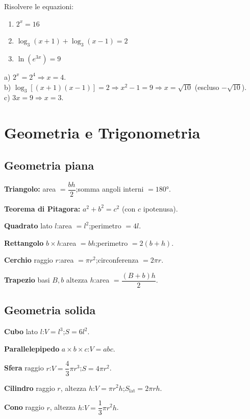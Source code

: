 \documentclass[12pt, a4paper, twoside, openright]{book}
\theoremstyle{definition}
\begin{document}
\begin{esercizio}
Risolvere le equazioni:
\begin{enumerate}[label=\alph*)]
  \item $2^x = 16$
  \item $\log_3(x+1) + \log_3(x-1) = 2$
  \item $\ln(e^{3x}) = 9$
\end{enumerate}
\end{esercizio}
\begin{soluzione}
a) $2^x = 2^4 \Rightarrow x = 4$.\\
b) $\log_3[(x+1)(x-1)] = 2 \Rightarrow x^2-1 = 9 \Rightarrow x = \sqrt{10}$ (escluso $-\sqrt{10}$).\\
c) $3x = 9 \Rightarrow x = 3$.
\end{soluzione}

\chapter{Geometria e Trigonometria}

\section{Geometria piana}

\begin{formulario}
\textbf{Triangolo:} area $= \dfrac{bh}{2}$;\quad somma angoli interni $= 180°$.

\textbf{Teorema di Pitagora:} $a^2 + b^2 = c^2$ (con $c$ ipotenusa).

\textbf{Quadrato} lato $l$:\quad area $= l^2$;\quad perimetro $= 4l$.

\textbf{Rettangolo} $b \times h$:\quad area $= bh$;\quad perimetro $= 2(b+h)$.

\textbf{Cerchio} raggio $r$:\quad area $= \pi r^2$;\quad circonferenza $= 2\pi r$.

\textbf{Trapezio} basi $B,b$ altezza $h$:\quad area $= \dfrac{(B+b)h}{2}$.
\end{formulario}

\section{Geometria solida}

\begin{formulario}
\textbf{Cubo} lato $l$:\quad $V = l^3$;\quad $S = 6l^2$.

\textbf{Parallelepipedo} $a \times b \times c$:\quad $V = abc$.

\textbf{Sfera} raggio $r$:\quad $V = \dfrac{4}{3}\pi r^3$;\quad $S = 4\pi r^2$.

\textbf{Cilindro} raggio $r$, altezza $h$:\quad $V = \pi r^2 h$;\quad $S_\text{lat} = 2\pi r h$.

\textbf{Cono} raggio $r$, altezza $h$:\quad $V = \dfrac{1}{3}\pi r^2 h$.
\end{formulario}
\end{document}
